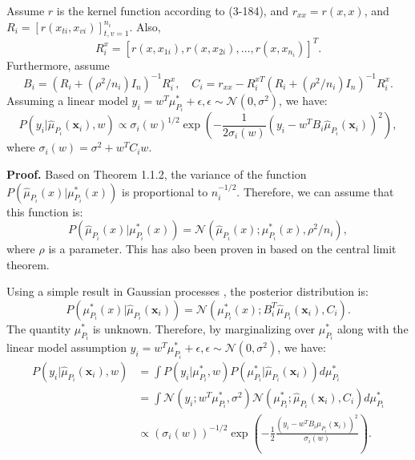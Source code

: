 	\begin{lemma}
		Assume $r$ is the kernel function according to (3-184), and $r_{xx} = r(x, x)$, and $R_i = [r(x_{ti}, x_{vi})]_{t,v=1}^{n_i}$. Also,
		\begin{equation}
			R_i^x = [r(x, x_{1i}), r(x, x_{2i}), \ldots, r(x, x_{n_i})]^T.
		\end{equation}
		Furthermore, assume
		\begin{equation}
			B_i = (R_i + (\rho^2 / n_i) I_n)^{-1} R_i^x, \quad C_i = r_{xx} - R_i^{xT} (R_i + (\rho^2 / n_i) I_n)^{-1} R_i^x.
		\end{equation}
		Assuming a linear model $y_i = w^T \mu^*_{P_i} + \epsilon, \epsilon \sim \mathcal{N}(0, \sigma^2)$, we have:
		\begin{equation}
			P(y_i | \hat{\mu}_{P_i}(\mathbf{x}_i), w) \propto \sigma_i(w)^{1/2} \exp\left( -\frac{1}{2 \sigma_i(w)} (y_i - w^T B_i \hat{\mu}_{P_i}(\mathbf{x}_i))^2 \right),
		\end{equation}
		where $\sigma_i(w) = \sigma^2 + w^T C_i w$.
	\end{lemma}
	
	\textbf{Proof.} Based on Theorem 1.1.2, the variance of the function $P(\hat{\mu}_{P_i}(x) | \mu^*_{P_i}(x))$ is proportional to $n_i^{-1/2}$. Therefore, we can assume that this function is:
	\begin{equation}
		P(\hat{\mu}_{P_i}(x) | \mu^*_{P_i}(x)) = \mathcal{N}(\hat{\mu}_{P_i}(x); \mu^*_{P_i}(x), \rho^2 / n_i),
	\end{equation}
	where $\rho$ is a parameter. This has also been proven in \cite{flaxman2015fast} based on the central limit theorem.
	
	Using a simple result in Gaussian processes \cite{mackay1992information}, the posterior distribution is:
	\begin{equation}
		P(\mu^*_{P_i}(x) | \hat{\mu}_{P_i}(\mathbf{x}_i)) = \mathcal{N}(\mu^*_{P_i}(x); B_i^T \hat{\mu}_{P_i}(\mathbf{x}_i), C_i).
	\end{equation}
	The quantity $\mu^*_{P_i}$ is unknown. Therefore, by marginalizing over $\mu^*_{P_i}$ along with the linear model assumption $y_i = w^T \mu^*_{P_i} + \epsilon, \epsilon \sim \mathcal{N}(0, \sigma^2)$, we have:
	\begin{align}
		P(y_i | \hat{\mu}_{P_i}(\mathbf{x}_i), w) &= \int P(y_i | \mu^*_{P_i}, w) P(\mu^*_{P_i} | \hat{\mu}_{P_i}(\mathbf{x}_i)) d\mu^*_{P_i} \\
		&= \int \mathcal{N}(y_i; w^T \mu^*_{P_i}, \sigma^2) \mathcal{N}(\mu^*_{P_i}; \hat{\mu}_{P_i}(\mathbf{x}_i), C_i) d\mu^*_{P_i} \\
		&\propto (\sigma_i(w))^{-1/2} \exp\left( -\frac{1}{2} \frac{(y_i - w^T B_i \hat{\mu}_{P_i}(\mathbf{x}_i))^2}{\sigma_i(w)} \right).
	\end{align}
	
